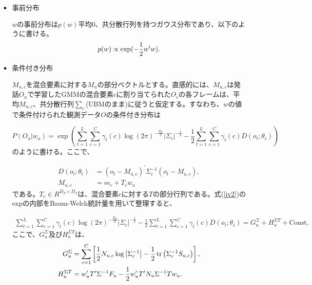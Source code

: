 \begin{itemize}
\item 事前分布\par
$w$の事前分布は$p(w)$平均0、共分散行列を持つガウス分布であり、以下のように書ける。
\begin{equation}
p(w)\propto \exp(-\frac{1}{2}w^{\prime}w). \notag
\end{equation}

\item 条件付き分布\par
$M_{u,c}$を混合要素に対する$M_u$の部分ベクトルとする。直感的には、$M_{u,c}$は発話$O_u$で学習したGMMの混合要素$c$に割り当てられた$O_c$の各フレームは、平均$M_{u,c}$、共分散行列$\sum_{c}$(UBMのまま)に従うと仮定する。すなわち、$w$の値で条件付けられた観測データ$O$の条件付き分布は

\begin{equation}
\label{iv2}
P(O_u|w_u)=\exp\left(\sum_{t=1}^{L}\sum_{c=1}^{C}\gamma_t(c)\log(2\pi )^{-\frac{D_F}{2}}\left|\Sigma_{c}\right|^{-\frac{1}{2}}-\frac{1}{2}\sum_{t=1}^{L}\sum_{c=1}^{C}\gamma_t(c)D(o_t;\theta_c) \right)
\end{equation}
のように書ける。ここで、

\begin{align}
D(o_t;\theta_t) &=(o_t-M_{u,c})^\prime \Sigma_{c}^{-1}(o_t-M_{u,c}), \\
M_{u,c} &=m_c+T_cw_u
\end{align}
である。$T_c\in R^{D_F\times D_T}$は、混合要素$c$に対する$T$の部分行列である。式(\ref{iv2})のexpの内部をBaum-Welch統計量を用いて整理すると、

\begin{equation}
\begin{split}
\sum_{t=1}^{L}\sum_{c=1}^{C}\gamma_t(c)\log(2\pi )^{-\frac{D_F}{2}}\left|\Sigma_{c}\right|^{-\frac{1}{2}}-\frac{1}{2}\sum_{t=1}^{L}\sum_{c=1}^{C}\gamma_t(c)D(o_t;\theta_c)=G_u^\Sigma+H_u^{\Sigma T}+\text{Const,}
\end{split}
\end{equation}
ここで、$G_u^\Sigma$及び$H_u^{\Sigma T}$は、
\begin{align}
G_u^\Sigma &=\sum_{c=1}^C\left[\frac{1}{2}N_{u,c}\log\left|\Sigma_c^{-1}\right|-\frac{1}{2}\tr\left(\Sigma_c^{-1}S_{u,c}\right)\right], \\
H_u^{\Sigma T} &=w_u^\prime T^\prime \Sigma^{-1}F_u-\frac{1}{2}w_u^\prime T^\prime N_u\Sigma^{-1}Tw_u. \label{iv3}
\end{align}


\end{itemize}
